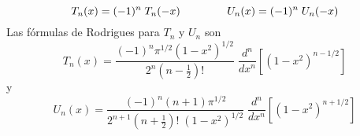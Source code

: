 \begin{equation}
T_{n}(x) = (-1)^{n} \; T_{n}(-x) \hspace{1.5cm} U_{n}(x) = (-1)^{n} \; U_{n}(-x)
\label{eq:ecuacion_13_104}
\end{equation}
Las fórmulas de Rodrigues para $T_{n}$ y $U_{n}$ son
\begin{equation}
T_{n}(x) = \dfrac{(-1)^{n} \pi^{1/2}(1 - x^{2})^{1/2}}{2^{n} (n - \frac{1}{2})!} \; \dfrac{d^{n}}{d x^{n}}\left[ (1 - x^{2})^{n - 1/2} \right]
\label{eq:ecuacion_13_105}
\end{equation}
y
\begin{equation}
U_{n}(x) = \dfrac{(-1)^{n} (n + 1)  \pi^{1/2}}{2^{n + 1} (n + \frac{1}{2})! \; (1 - x^{2})^{1/2}} \; \dfrac{d^{n}}{d x^{n}}\left[ (1 - x^{2})^{n + 1/2} \right]
\label{eq:ecuacion_13_105}
\end{equation}
